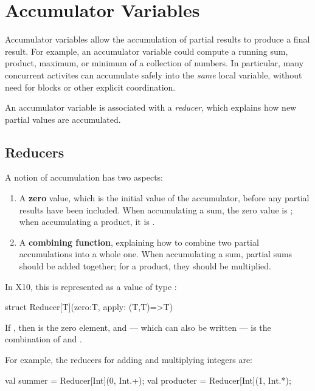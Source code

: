 \section{Accumulator Variables}

Accumulator variables allow the accumulation of partial results to produce a
final result.  For example, an accumulator variable could compute a running
sum, product, maximum, or minimum of a collection of numbers.  In particular,
many concurrent activites can accumulate safely into the {\em same} local
variable, without need for  blocks or other explicit coordination.  

An accumulator variable is associated with a {\em reducer}, which explains how
new partial values are accumulated.

\subsection{Reducers}

A notion of accumulation has two aspects: 
\begin{enumerate}
\item A {\bf zero} value, which is the initial value of the accumulator,
      before any partial results have been included.  When accumulating a sum,
      the zero value is ; when accumulating a product, it is .
\item A {\bf combining function}, explaining how to combine two partial
      accumulations into a whole one.  When accumulating a sum, partial sums
      should be added together; for a product, they should be multiplied.  
\end{enumerate}

In X10, this is represented as a value of type
: 
\begin{xten}
struct Reducer[T](zero:T, apply: (T,T)=>T){}
\end{xten}
%
\noindent 
If , then  is the zero element, and
 --- which can also be written  --- is the
combination of  and .

For example, the reducers for adding and multiplying integers are: 
\begin{xten}
val summer = Reducer[Int](0, Int.+);
val producter = Reducer[Int](1, Int.*);
\end{xten}



